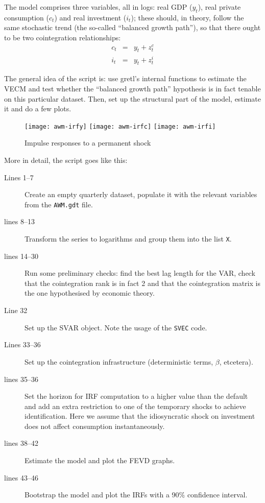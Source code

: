 \documentclass[a4paper,10pt]{article}
\newcommand{\app}[1]{\textsf{#1}}
\newcounter{script}[section]
\begin{document}
The model comprises three variables, all in logs: real GDP ($y_t$),
real private consumption ($c_t$) and real investment ($i_t$); these
should, in theory, follow the same stochastic trend (the so-called
``balanced growth path''), so that there ought to be two cointegration
relationships:
\begin{eqnarray*}
  c_t &=& y_t + z^c_t \\
  i_t &=& y_t + z^i_t
\end{eqnarray*}

The general idea of the script is: use \app{gretl}'s internal
functions to estimate the VECM and test whether the ``balanced growth
path'' hypothesis is in fact tenable on this particular dataset. Then,
set up the structural part of the model, estimate it and do a few
plots.

\begin{figure}[htbp]
  \centering
  \texttt{[image: awm-irfy]}
  \texttt{[image: awm-irfc]}
  \texttt{[image: awm-irfi]}
  \caption{Impulse responses to a permanent shock}
  \label{fig:AWM-irfs}
\end{figure}

More in detail, the script goes like this:
\begin{description}
\item[Lines 1--7] Create an empty quarterly dataset, populate it with
  the relevant variables from the \texttt{AWM.gdt} file.
\item[lines 8--13] Transform the series to logarithms and group them
  into the list \texttt{X}.
\item[lines 14--30] Run some preliminary checks: find the best lag
  length for the VAR, check that the cointegration rank is in fact 2
  and that the cointegration matrix is the one hypothesised by
  economic theory.
\item[Line 32] Set up the SVAR object. Note the usage of the
  \texttt{SVEC} code.
\item[Lines 33--36] Set up the cointegration infrastructure
  (deterministic terms, $\beta$, etcetera).
\item[lines 35--36] Set the horizon for IRF computation to a higher
  value than the default and add an extra restriction to one of the
  temporary shocks to achieve identification. Here we assume that the
  idiosyncratic shock on investment does not affect consumption
  instantaneously.
\item[lines 38--42] Estimate the model and plot the FEVD graphs.
\item[lines 43--46] Bootstrap the model and plot the IRFs with a
  90\% confidence interval.
\end{description}
\end{document}
